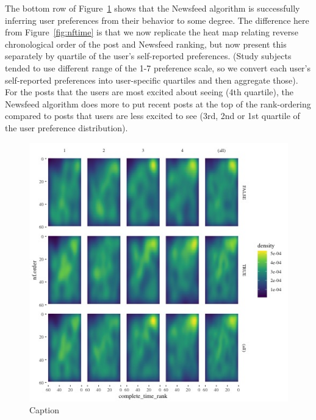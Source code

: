 \documentclass[12pt,letterpaper]{article}
\begin{document}
The bottom row of Figure~\ref{fig:nf_time_pref_group} shows that the Newsfeed algorithm is successfully inferring user preferences from their behavior to some degree. The difference here from Figure~\ref{fig:nftime} is that we now replicate the heat map relating reverse chronological order of the post and Newsfeed ranking, but now present this separately by quartile of the user's self-reported preferences. (Study subjects tended to use different range of the 1-7 preference scale, so we convert each user's self-reported preferences into user-specific quartiles and then aggregate those).  For the posts that the users are most excited about seeing (4th quartile), the Newsfeed algorithm does more to put recent posts at the top of the rank-ordering compared to posts that users are less excited to see (3rd, 2nd or 1st quartile of the user preference distribution).

\begin{figure}[h]
    \centering
    \includegraphics[scale=0.5]{Output/Graphs/Audit/Heatmaps/India NF chron rank by nf rank by norm quartile - smooth.jpg}
    \caption{Caption}
    \label{fig:nf_time_pref_group}
\end{figure}
\end{document}

